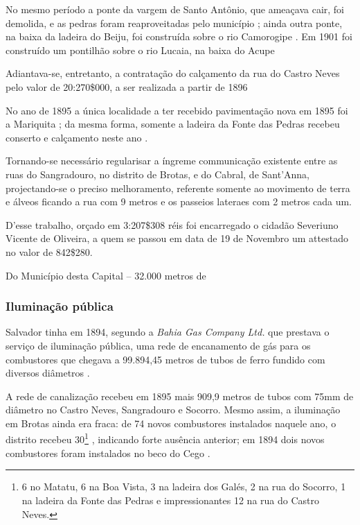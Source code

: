 No mesmo período a ponte da vargem de Santo Antônio, que ameaçava cair, foi demolida, e as pedras foram reaproveitadas pelo município \cite[p.~137]{salvador_relatorio_1896}; ainda outra ponte, na baixa da ladeira do Beiju, foi construída sobre o rio Camorogipe \cite[p.~156]{salvador_relatorio_1894}. Em 1901 foi construído um pontilhão sobre o rio Lucaia, na baixa do Acupe 

Adiantava-se, entretanto, a contratação do calçamento da rua do Castro Neves pelo valor de 20:270\$000, a ser realizada a partir de 1896 \cite[p.~23]{salvador_relatorio_1896}

No ano de 1895 a única localidade a ter recebido pavimentação nova em 1895 foi a Mariquita \cite[p.~16]{salvador_relatorio_1896}; da mesma forma, somente a ladeira da Fonte das Pedras recebeu conserto e calçamento neste ano \cite[p.~16]{salvador_relatorio_1896}. 



\begin{citacao}
Tornando-se necessário regularisar a íngreme communicação existente entre as ruas do Sangradouro, no distrito de Brotas, e do Cabral, de Sant'Anna, projectando-se o preciso melhoramento, referente somente ao movimento de terra e álveos ficando a rua com 9 metros e os passeios lateraes com 2 metros cada um.

D'esse trabalho, orçado em 3:207\$308 réis foi encarregado o cidadão Severiuno Vicente de Oliveira, a quem se passou em data de 19 de Novembro um attestado no valor de 842\$280.
\end{citacao}

\begin{citacao}
Do Município desta Capital -- 32.000 metros de 
\end{citacao}








\subsubsection{Iluminação pública}


Salvador tinha em 1894, segundo a \textit{Bahia Gas Company Ltd.} que prestava o serviço de iluminação pública, uma rede de encanamento de gás para os combustores que chegava a 99.894,45 metros de tubos de ferro fundido com diversos diâmetros \cite[p.~178]{salvador_relatorio_1894}.

A rede de canalização recebeu em 1895 mais 909,9 metros de tubos com 75mm de diâmetro no Castro Neves, Sangradouro e Socorro. Mesmo assim, a iluminação em Brotas ainda era fraca: de 74 novos combustores instalados naquele ano, o distrito recebeu 30\footnote{6 no Matatu, 6 na Boa Vista, 3 na ladeira dos Galés, 2 na rua do Socorro, 1 na ladeira da Fonte das Pedras e impressionantes 12 na rua do Castro Neves.} \cite[pp.~149-150]{salvador_relatorio_1896}, indicando forte ausência anterior; em 1894 dois novos combustores foram instalados no beco do Cego \cite[p.~179]{salvador_relatorio_1894}.


